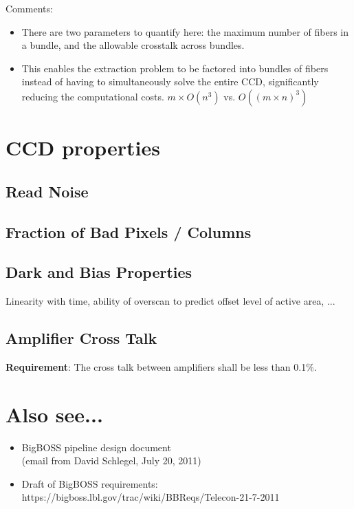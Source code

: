 \documentclass[12pt]{article}
\begin{document}
Comments:
\begin{itemize}
    \item There are two parameters to quantify here: the maximum number
        of fibers in a bundle, and the allowable crosstalk across bundles.
    \item This enables the extraction problem to be factored into bundles
        of fibers instead of having to simultaneously solve the entire CCD,
        significantly reducing the computational costs.
        $m \times O(n^3)$ vs. $O((m \times n)^3)$
\end{itemize}

\section{CCD properties}
\subsection{Read Noise}

\subsection{Fraction of Bad Pixels / Columns}

\subsection{Dark and Bias Properties}
Linearity with time, ability of overscan to predict offset level of
active area, ...

\subsection{Amplifier Cross Talk}
\label{sec:ccd_amp_xtalk}
{\bf Requirement}: The cross talk between amplifiers shall be less than 0.1\%.

\section{Also see...}

\begin{itemize}
    \item BigBOSS pipeline design document \\
        (email from David Schlegel, July 20, 2011)
    \item Draft of BigBOSS requirements: \\
        https://bigboss.lbl.gov/trac/wiki/BBReqs/Telecon-21-7-2011
\end{itemize}
\end{document}

